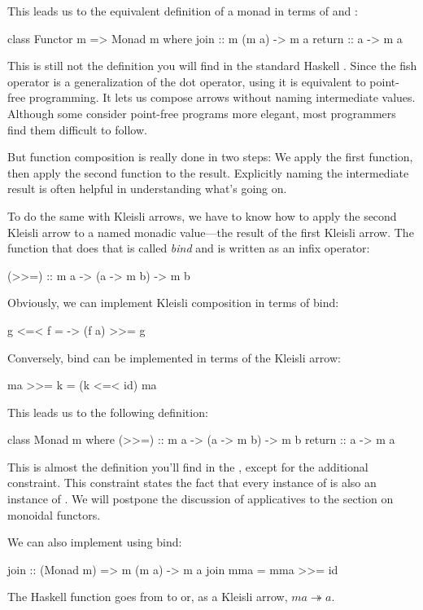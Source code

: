 \documentclass[DaoFP]{subfiles}
\begin{document}
This leads us to the equivalent definition of a monad in terms of  and :
\begin{haskell}
class Functor m => Monad m where
  join :: m (m a) -> m a
  return :: a -> m a
\end{haskell}

This is still not the definition you will find in the standard Haskell . Since the fish operator is a generalization of the dot operator, using it is equivalent to point-free programming. It lets us compose arrows without naming intermediate values. Although some consider point-free programs more elegant, most programmers find them difficult to follow. 

But function composition is really done in two steps: We apply the first function, then apply the second function to the result. Explicitly naming the intermediate result is often helpful in understanding what's going on.

To do the same with Kleisli arrows, we have to know how to apply the second Kleisli arrow to a named monadic value---the result of the first Kleisli arrow. The function that does that is called \emph{bind} and is written as an infix operator:
\begin{haskell}
(>>=) :: m a -> (a -> m b) -> m b
\end{haskell}
Obviously, we can implement Kleisli composition in terms of bind:

\begin{haskell}
g <=< f = \a -> (f a) >>= g
\end{haskell}

Conversely, bind can be implemented in terms of the Kleisli arrow:
\begin{haskell}
ma >>= k = (k <=< id) ma
\end{haskell}

This leads us to the following definition:
\begin{haskell}
class Monad m where
  (>>=) :: m a -> (a -> m b) -> m b
  return :: a -> m a 
\end{haskell}
This is almost the definition you'll find in the , except for the additional constraint. This constraint states the fact that every instance of  is also an instance of . We will postpone the discussion of applicatives to the section on monoidal functors.

We can also implement  using bind:
\begin{haskell}
join  :: (Monad m) => m (m a) -> m a
join mma =  mma >>= id
\end{haskell}
The Haskell function  goes from  to  or, as a Kleisli arrow, $m a \twoheadrightarrow a$.
\end{document}
